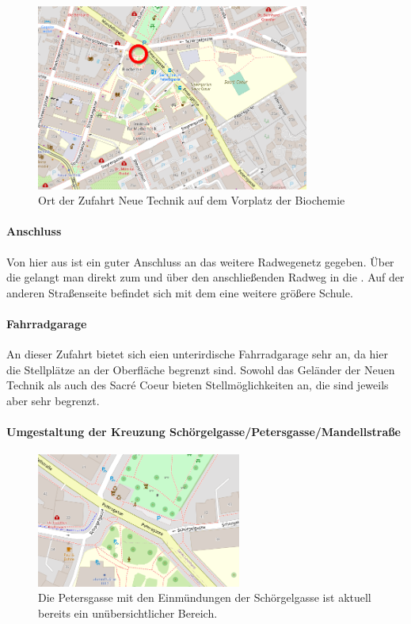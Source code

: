 \begin{figure}
    \centering
    \includegraphics[width=0.8\textwidth]{main/bike/tunnel/uni/zufahrt_neue_technik}
    \caption[Zufahrt Neue Technik]{Ort der Zufahrt Neue Technik auf dem Vorplatz der Biochemie}
\end{figure}

\paragraph{Anschluss}
Von hier aus ist ein guter Anschluss an das weitere Radwegenetz gegeben. Über die  gelangt man direkt zum  und über den anschließenden Radweg in die . Auf der anderen Straßenseite befindet sich mit dem  eine weitere größere Schule.

\paragraph{Fahrradgarage}
An dieser Zufahrt bietet sich eien unterirdische Fahrradgarage sehr an, da hier die Stellplätze an der Oberfläche begrenzt sind. Sowohl das Geländer der Neuen Technik als auch des Sacré Coeur bieten Stellmöglichkeiten an, die sind jeweils aber sehr begrenzt.

\paragraph{Umgestaltung der Kreuzung Schörgelgasse/Petersgasse/Mandellstraße}
\begin{figure}
    \centering
    \includegraphics[width=0.6\textwidth]{main/bike/tunnel/uni/kreuzung1}
    \caption[Petersgasse/Mandellstraße mit Kreuzung Schörgelgasse]{Die Petersgasse mit den Einmündungen der Schörgelgasse ist aktuell bereits ein unübersichtlicher Bereich.}
\end{figure}

